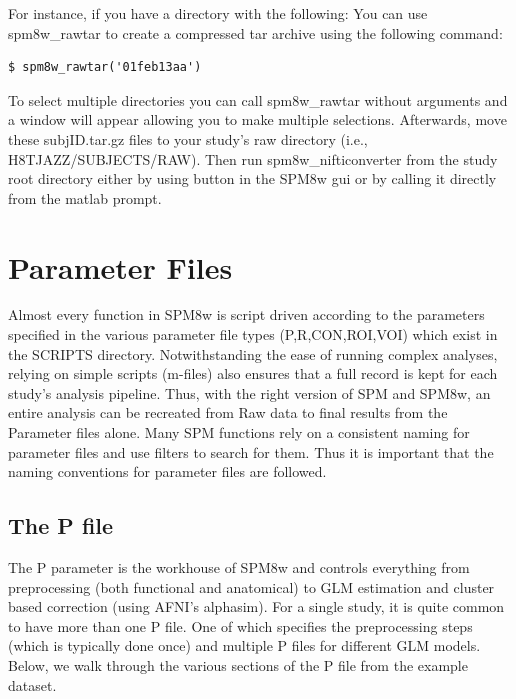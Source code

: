 \documentclass[12pt]{article}
\begin{document}
For instance, if you have a directory with the following:
\vspace{\baselineskip}
\vspace{\baselineskip}
You can use spm8w\_rawtar to create a compressed tar archive using the following command: 
\begin{lstlisting}
$ spm8w_rawtar('01feb13aa')
\end{lstlisting}

To select multiple directories you can call spm8w\_rawtar without arguments and a window will appear allowing you to make multiple selections. Afterwards, move these subjID.tar.gz files to your study's raw directory (i.e., H8TJAZZ/SUBJECTS/RAW). Then run spm8w\_nifticonverter from the study root directory either by using button in the SPM8w gui or by calling it directly from the matlab prompt. 
\newpage

\section{Parameter Files}
\secttoc  %
\vspace{\baselineskip}
Almost every function in SPM8w is script driven according to the parameters specified in the various parameter file types (P,R,CON,ROI,VOI) which exist in the SCRIPTS directory. Notwithstanding the ease of running complex analyses, relying on simple scripts (m-files) also ensures that a full record is kept for each study's analysis pipeline. Thus, with the right version of SPM and SPM8w, an entire analysis can be recreated from Raw data to final results from the Parameter files alone. Many SPM functions rely on a consistent naming for parameter files and use filters to search for them. Thus it is important that the naming conventions for parameter files are followed. 

\subsection{The P file}
The P parameter is the workhouse of SPM8w and controls everything from preprocessing (both functional and anatomical) to GLM estimation and cluster based correction (using AFNI's alphasim).  
For a single study, it is quite common to have more than one P file. One of which specifies the preprocessing steps (which is typically done once) and multiple P files for different GLM models. Below, we walk through the various sections of the P file from the example dataset. 
\end{document}
